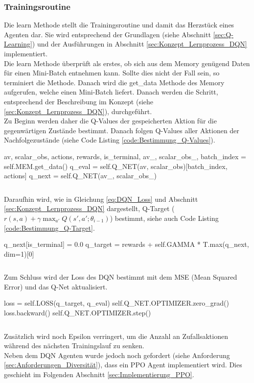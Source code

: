 \subsubsection{Trainingsroutine} \label{sec:Implementierung_learn_DQN}
Die learn Methode stellt die Trainingsroutine und damit das Herzstück eines Agenten dar. Sie wird entsprechend der Grundlagen (siehe Abschnitt \ref{sec:Q-Learning}) und der Ausführungen in Abschnitt \ref{sec:Konzept_Lernprozess_DQN} implementiert.\\
Die learn Methode überprüft als erstes, ob sich aus dem Memory genügend Daten für einen Mini-Batch entnehmen kann. Sollte dies nicht der Fall sein, so terminiert die Methode.
Danach wird die get\_data Methode des Memory aufgerufen, welche einen Mini-Batch liefert. Danach werden die Schritt, entsprechend der Beschreibung im Konzept (siehe \ref{sec:Konzept_Lernprozess_DQN}), durchgeführt.\\
Zu Beginn werden daher die Q-Values der gespeicherten Aktion für die gegenwärtigen Zustände bestimmt. Danach folgen Q-Values aller Aktionen der Nachfolgezustände (siehe Code Listing \ref{code:Bestimmung_Q-Values}).
\begin{python}
av, scalar_obs, actions, rewards, is_terminal, av_, scalar_obs_, batch_index = self.MEM.get_data()
q_eval = self.Q_NET(av, scalar_obs)[batch_index, actions]
q_next = self.Q_NET(av_, scalar_obs_)
\end{python}
\begin{lstlisting}[caption=Bestimmung der Q-Values, label=code:Bestimmung_Q-Values]
\end{lstlisting}
Daraufhin wird, wie in Gleichung \ref{eq:DQN_Loss} und Abschnitt \ref{sec:Konzept_Lernprozess_DQN} dargestellt, Q-Target ($r(s,a) +\gamma \max_{a'}Q(s',a';\theta_{i-1})$) bestimmt, siehe auch Code Listing \ref{code:Bestimmung_Q-Target}.
\begin{python}
q_next[is_terminal] = 0.0
q_target = rewards + self.GAMMA * T.max(q_next, dim=1)[0]
\end{python}
\begin{lstlisting}[caption=Bestimmung von Q-Target, label=code:Bestimmung_Q-Target]
\end{lstlisting}
Zum Schluss wird der Loss des DQN bestimmt mit dem MSE (Mean Squared Error) und das Q-Net aktualisiert.
\begin{python}
loss = self.LOSS(q_target, q_eval)
self.Q_NET.OPTIMIZER.zero_grad()
loss.backward()
self.Q_NET.OPTIMIZER.step()
\end{python}
\begin{lstlisting}[caption=Bestimmung des DQN Loss \& Update des Q-Networks, label=code:Bestimmung_DQN-Loss]
\end{lstlisting}
Zusätzlich wird noch Epsilon verringert, um die Anzahl an Zufallsaktionen während des nächsten Trainingslauf zu senken.\\
Neben dem DQN Agenten wurde jedoch noch gefordert (siehe Anforderung \ref{sec:Anforderungen_Diversität}), dass ein PPO Agent implementiert wird. Dies geschieht im Folgenden Abschnitt \ref{sec:Implementierung_PPO}.

